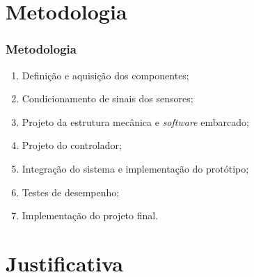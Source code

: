 %
%
%

\section{Metodologia}

\begin{frame}
\frametitle{Metodologia}

	\begin{enumerate}
	\item Definição e aquisição dos componentes;
	\item Condicionamento de sinais dos sensores;
	\item Projeto da estrutura mecânica e \textit{software} embarcado;
	\item Projeto do controlador;
	\item Integração do sistema e implementação do protótipo;
	\item Testes de desempenho;
	\item Implementação do projeto final.
	\end{enumerate}
	
\end{frame}

\section{Justificativa}



